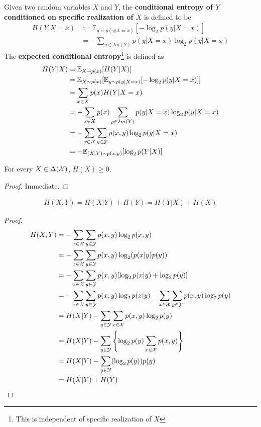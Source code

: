 \documentclass{article}
\begin{document}
	\begin{definition}
		Given two random variables $X$ and $Y$, the \textbf{conditional entropy of $Y$ conditioned on specific realization of $X$} is defined to be 
		\begin{align}
			H(Y|X=x) &:= \mathbb{E}_{y \sim p(y|X=x)}[
				-\log_2 p(y|X=x)
			] \\
			&= - \sum_{y \in Im(Y)} p(y|X=x) \log_2 p(y|X=x)
		\end{align}
		The \textbf{expected conditional entropy}\footnote{This is independent of specific realization of $X$} is defined as 
		\begin{align}
			H(Y|X) &= \mathbb{E}_{X \sim p(x)} [H(Y|X)] \\
			&= \mathbb{E}_{X \sim p(x)} [\mathbb{E}_{y \sim p(y|X=x)}[
				-\log_2 p(y|X=x)]
			] \\
			&= \sum_{x \in X} p(x) H(Y|X=x) \\
			&= - \sum_{x \in X} p(x) \sum_{y \in Im(Y)} p(y|X=x) \log_2 p(y|X=x) \\
			&= - \sum_{x \in \mathcal{{X}}} \sum_{y \in \mathcal{{Y}}} p(x, y) \log_2 p(y | X = x) \\
			&= - \mathbb{E}_{(X, Y) \sim p(x, y)} [\log_2 p(Y|X)]
		\end{align}
	\end{definition}
	
	\begin{proposition}
		For every $X \in \Delta(\mathcal{{X}})$, $H(X) \geq 0$.
		\begin{proof}
			Immediate.
		\end{proof}
	\end{proposition}
	
	\begin{proposition}
		\begin{align}
			H(X, Y)=H(X | Y)+H(Y)=H(Y | X)+H(X)
		\end{align}
	\end{proposition}
	
	\begin{proof}
		\begin{align}
			H(X, Y) &= - \sum_{x \in \mathcal{{X}}} \sum_{y \in \mathcal{{Y}}} p(x, y) \log_2 p(x, y) \\
			&= - \sum_{x \in \mathcal{{X}}} \sum_{y \in \mathcal{{Y}}} p(x, y) \log_2 (p(x|y) p(y)) \\
			&= - \sum_{x \in \mathcal{{X}}} \sum_{y \in \mathcal{{Y}}} p(x, y) [\log_2 p(x|y) + \log_2 p(y)] \\
			&= - \sum_{x \in \mathcal{{X}}} \sum_{y \in \mathcal{{Y}}} p(x, y) \log_2 p(x|y) - \sum_{x \in \mathcal{{X}}} \sum_{y \in \mathcal{{Y}}} p(x, y) \log_2 p(y) \\
			&= H(X|Y) - \sum_{y \in \mathcal{{Y}}}\sum_{x \in \mathcal{{X}}} p(x, y) \log_2 p(y) \\
			&= H(X|Y) - \sum_{y \in \mathcal{{Y}}}\left\{ \log_2 p(y) \sum_{x \in \mathcal{{X}}} p(x, y)\right\} \\
			&= H(X|Y) - \sum_{y \in \mathcal{{Y}}} (\log_2 p(y)) p(y) \\
			&= H(X|Y) + H(Y)
		\end{align}
	\end{proof}
	
\end{document}
